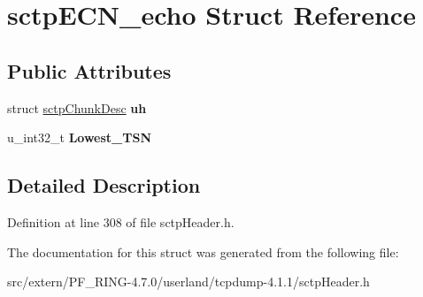 \hypertarget{structsctp_e_c_n__echo}{
\section{sctpECN\_\-echo Struct Reference}
\label{structsctp_e_c_n__echo}
}
\subsection*{Public Attributes}
\begin{DoxyCompactItemize}
\item 
\hypertarget{structsctp_e_c_n__echo_a7c6664b650d32337830f2ea05cb9e77d}{
struct \hyperlink{structsctp_chunk_desc}{sctpChunkDesc} {\bfseries uh}}
\label{structsctp_e_c_n__echo_a7c6664b650d32337830f2ea05cb9e77d}

\item 
\hypertarget{structsctp_e_c_n__echo_af79f300a634723207a9abaef3e611a44}{
u\_\-int32\_\-t {\bfseries Lowest\_\-TSN}}
\label{structsctp_e_c_n__echo_af79f300a634723207a9abaef3e611a44}

\end{DoxyCompactItemize}


\subsection{Detailed Description}


Definition at line 308 of file sctpHeader.h.



The documentation for this struct was generated from the following file:\begin{DoxyCompactItemize}
\item 
src/extern/PF\_\-RING-\/4.7.0/userland/tcpdump-\/4.1.1/sctpHeader.h\end{DoxyCompactItemize}
